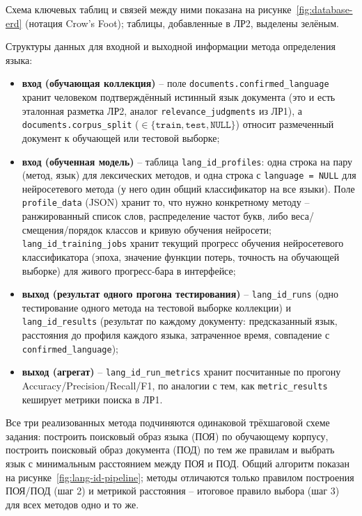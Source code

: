 
Схема ключевых таблиц и связей между ними показана на
рисунке~\ref{fig:database-erd} (нотация Crow's Foot); таблицы, добавленные
в ЛР2, выделены зелёным.


Структуры данных для входной и выходной информации метода определения
языка:
\begin{itemize}
  \item \textbf{вход (обучающая коллекция)} -- поле
  \texttt{documents.confirmed\_language} хранит человеком подтверждённый
  истинный язык документа (это и есть эталонная разметка ЛР2, аналог
  \texttt{relevance\_judgments} из ЛР1), а \texttt{documents.corpus\_split}
  ($\in \{\texttt{train}, \texttt{test}, \texttt{NULL}\}$) относит
  размеченный документ к обучающей или тестовой выборке;
  \item \textbf{вход (обученная модель)} -- таблица
  \texttt{lang\_id\_profiles}: одна строка на пару (метод, язык) для
  лексических методов, и одна строка с \texttt{language = NULL} для
  нейросетевого метода (у него один общий классификатор на все языки).
  Поле \texttt{profile\_data} (JSON) хранит то, что нужно конкретному
  методу -- ранжированный список слов, распределение частот букв, либо
  веса/смещения/порядок классов и кривую обучения нейросети;
  \texttt{lang\_id\_training\_jobs} хранит текущий прогресс обучения
  нейросетевого классификатора (эпоха, значение функции потерь,
  точность на обучающей выборке) для живого прогресс-бара в интерфейсе;
  \item \textbf{выход (результат одного прогона тестирования)} --
  \texttt{lang\_id\_runs} (одно тестирование одного метода на тестовой
  выборке коллекции) и \texttt{lang\_id\_results} (результат по каждому
  документу: предсказанный язык, расстояния до профиля каждого языка,
  затраченное время, совпадение с \texttt{confirmed\_language});
  \item \textbf{выход (агрегат)} -- \texttt{lang\_id\_run\_metrics}
  хранит посчитанные по прогону Accuracy/Precision/Recall/F1, по
  аналогии с тем, как \texttt{metric\_results} кеширует метрики поиска
  в ЛР1.
\end{itemize}


Все три реализованных метода подчиняются одинаковой трёхшаговой схеме
задания: построить поисковый образ языка (ПОЯ) по обучающему корпусу,
построить поисковый образ документа (ПОД) по тем же правилам и выбрать
язык с минимальным расстоянием между ПОЯ и ПОД. Общий алгоритм показан
на рисунке~\ref{fig:lang-id-pipeline}; методы отличаются только
правилом построения ПОЯ/ПОД (шаг 2) и метрикой расстояния -- итоговое
правило выбора (шаг 3) для всех методов одно и то же.

